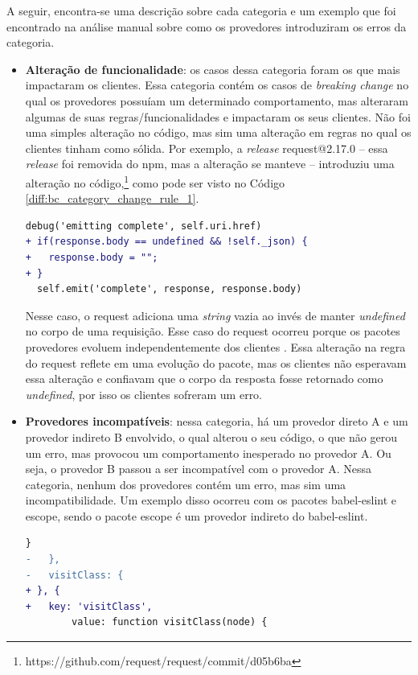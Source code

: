 A seguir, encontra-se uma descrição sobre cada categoria e um exemplo que foi encontrado na análise manual sobre como os provedores introduziram os erros da categoria.

\begin{itemize}
    \item \textbf{Alteração de funcionalidade}: os casos dessa categoria foram os que mais impactaram os clientes. Essa categoria contém os casos de \textit{breaking change} no qual os provedores possuíam um determinado comportamento, mas alteraram algumas de suas regras/funcionalidades e impactaram os seus clientes. Não foi uma simples alteração no código, mas sim uma alteração em regras no qual os clientes tinham como sólida. Por exemplo, a \textit{release} \textsf{request@2.17.0} -- essa \textit{release} foi removida do \textsf{npm}, mas a alteração se manteve -- introduziu uma alteração no código,\footnote{https://github.com/request/request/commit/d05b6ba} como pode ser visto no Código \ref{diff:bc_category_change_rule_1}.
    \vspace{0.4cm}
    \begin{lstlisting}[numbers=none, language=diff, label=diff:bc_category_change_rule_1, caption={Exemplo da categoria \textit{Alteração de funcionalidade}}]
  debug('emitting complete', self.uri.href)
+ if(response.body == undefined && !self._json) {
+   response.body = "";
+ }
  self.emit('complete', response, response.body)
    \end{lstlisting}

    Nesse caso, o \textsf{request} adiciona uma \textit{string} vazia ao invés de manter \textit{undefined} no corpo de uma requisição. Esse caso do \textsf{request} ocorreu porque os pacotes provedores evoluem independentemente dos clientes \cite{Foo:2018:ESC:3236024.3275535}. Essa alteração na regra do \textsf{request} reflete em uma evolução do pacote, mas os clientes não esperavam essa alteração e confiavam que o corpo da resposta fosse retornado como \textit{undefined}, por isso os clientes sofreram um erro.

    \item \textbf{Provedores incompatíveis}: nessa categoria, há um provedor direto \textsf{A} e um provedor indireto \textsf{B} envolvido, o qual alterou o seu código, o que não gerou um erro, mas provocou um comportamento inesperado no provedor \textsf{A}. Ou seja, o provedor \textsf{B} passou a ser incompatível com o provedor \textsf{A}. Nessa categoria, nenhum dos provedores contém um erro, mas sim uma incompatibilidade. Um exemplo disso ocorreu com os pacotes \textsf{babel-eslint} e \textsf{escope}, sendo o pacote \textsf{escope} é um provedor indireto do \textsf{babel-eslint}.
    \vspace{0.4cm}
    \begin{lstlisting}[numbers=none, language=diff, label=cod:bc_category_incompatibles_providers, caption={Exemplo da categoria \textit{Provedores incompatíveis}}]
  }
-   },
-   visitClass: {
+ }, {
+   key: 'visitClass',
        value: function visitClass(node) {
    \end{lstlisting}


\end{itemize}
